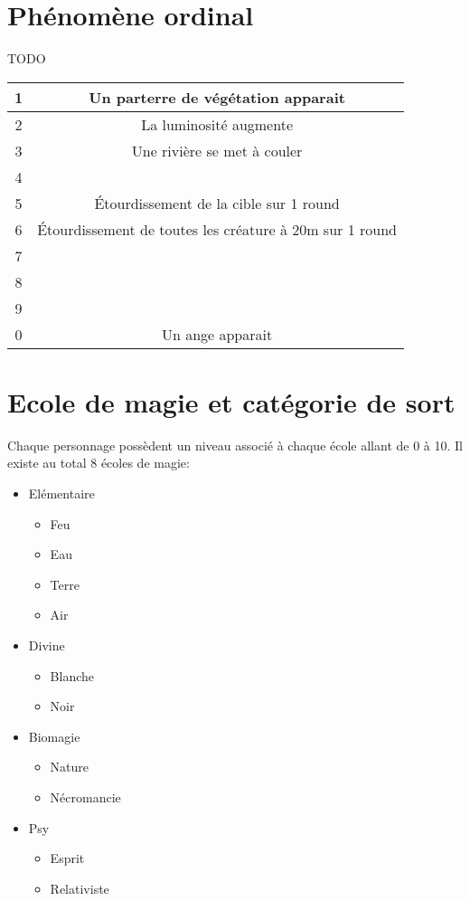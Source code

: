 \section{Phénomène ordinal}
TODO
\begin{tabular}{|c|c|}
\hline
1 &  Un parterre de végétation apparait\\
\hline
2 & La luminosité augmente \\
\hline
3 &  Une rivière se met à couler\\
\hline
4 &  \\
\hline
5 &  Étourdissement de la cible sur 1 round\\
\hline
6 &  Étourdissement de toutes les créature à 20m sur 1 round\\
\hline
7 &  \\
\hline
8 &  \\
\hline
9 &  \\
\hline
0 & Un ange apparait \\
\hline
\end{tabular}

\section{Ecole de magie et catégorie de sort}
Chaque personnage possèdent un niveau associé à chaque école allant de 0 à 10.
Il existe au total 8 écoles de magie: \\
\begin{itemize}
\item Elémentaire \\
\begin{itemize}
\item Feu
\item Eau
\item Terre
\item Air
\end{itemize}
\item Divine \\
\begin{itemize}
\item Blanche
\item Noir
\end{itemize}
\item Biomagie \\
\begin{itemize}
\item Nature
\item Nécromancie
\end{itemize}
\item Psy\\
\begin{itemize}
\item Esprit
\item Relativiste
\end{itemize}
\end{itemize}

